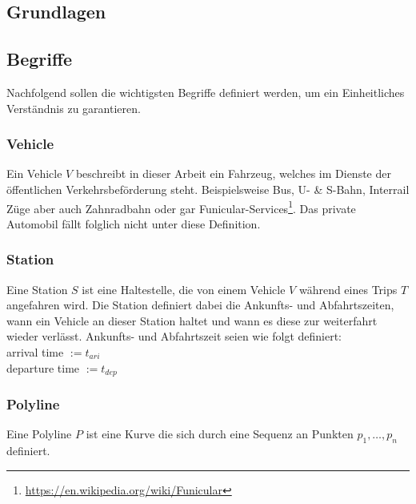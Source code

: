 \begin{newpage}
	
	\section{Grundlagen}
	\label{sec:Grundlagen}

  \subsection{Begriffe}
  \label{sub:begriffe}
    Nachfolgend sollen die wichtigsten Begriffe definiert werden, um ein Einheitliches Verständnis zu garantieren.

    \subsubsection{Vehicle}
    \label{ssub:vehicle}
      Ein Vehicle $V$ beschreibt in dieser Arbeit ein Fahrzeug, welches im Dienste der öffentlichen Verkehrsbeförderung steht. Beispielsweise Bus, U- \& S-Bahn, Interrail Züge aber auch Zahnradbahn oder gar Funicular-Services\footnote{\url{https://en.wikipedia.org/wiki/Funicular}}. Das private Automobil fällt folglich nicht unter diese Definition.

    \subsubsection{Station}
    \label{ssub:station}
      Eine Station $S$ ist eine Haltestelle, die von einem Vehicle $V$ während eines Trips $T$ angefahren wird. Die Station definiert dabei die Ankunfts- und Abfahrtszeiten, wann ein Vehicle an dieser Station haltet und wann es diese zur weiterfahrt wieder verlässt. Ankunfts- und Abfahrtszeit seien wie folgt definiert:\\

      arrival time $ := t_{ari}$\\
      departure time $ := t_{dep}$


    \subsubsection{Polyline}
    \label{ssub:polyline}
      Eine Polyline $P$ ist eine Kurve die sich durch eine Sequenz an Punkten $p_1, \dotsc, p_n$ definiert.



\end{newpage}
